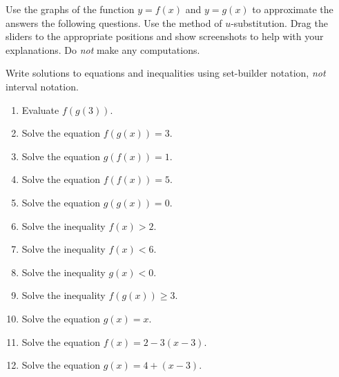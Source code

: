 \documentclass{ximera}
\begin{document}
\begin{question} \label{Ex:435rtggytt}
Use the graphs of the function $y=f(x)$ and $y=g(x)$ to approximate the answers the following questions. Use the method of $u$-substitution. Drag the sliders to the appropriate positions and show screenshots to help with your explanations. Do \emph{not} make any computations.

Write solutions to equations and inequalities using set-builder notation, \emph{not} interval notation.

\begin{onlineOnly}
    \begin{center}
\end{center}
\end{onlineOnly}


\begin{enumerate}

\item Evaluate $f(g(3))$.

\item Solve the equation $f(g(x)) = 3$.

\item Solve the equation $g(f(x))=1$.

\item Solve the equation $f(f(x)) = 5$.

\item Solve the equation $g(g(x)) = 0$.

\item Solve the inequality $f(x)>2$.

\item Solve the inequality $f(x)<6$.

\item Solve the inequality $g(x)<0$.

\item Solve the inequality $f(g(x))\geq 3$.

\item Solve the equation $g(x)=x$.

\item Solve the equation $f(x)=2 - 3(x-3)$.

\item Solve the equation $g(x) = 4+(x-3)$.

\end{enumerate}

\end{question}
\end{document}
